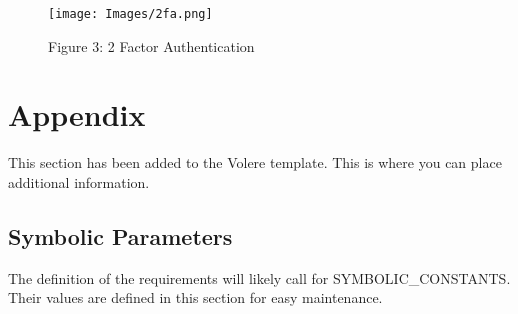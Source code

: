 \documentclass[12pt, titlepage]{article}
\begin{document}
\begin{figure}[h]
\texttt{[image: Images/2fa.png]}
\caption{Figure 3: 2 Factor Authentication}
\end{figure}





\newpage

\section{Appendix}

This section has been added to the Volere template.  This is where you can place
additional information.

\subsection{Symbolic Parameters}

The definition of the requirements will likely call for SYMBOLIC\_CONSTANTS.
Their values are defined in this section for easy maintenance.
\end{document}
